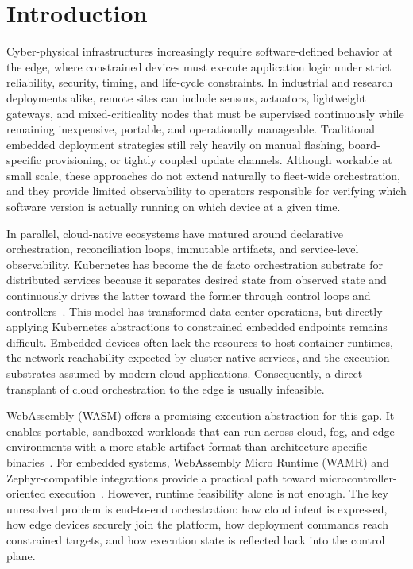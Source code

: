 \section{Introduction}

Cyber-physical infrastructures increasingly require software-defined behavior at the edge, where constrained devices must execute application logic under strict reliability, security, timing, and life-cycle constraints. In industrial and research deployments alike, remote sites can include sensors, actuators, lightweight gateways, and mixed-criticality nodes that must be supervised continuously while remaining inexpensive, portable, and operationally manageable. Traditional embedded deployment strategies still rely heavily on manual flashing, board-specific provisioning, or tightly coupled update channels. Although workable at small scale, these approaches do not extend naturally to fleet-wide orchestration, and they provide limited observability to operators responsible for verifying which software version is actually running on which device at a given time.

In parallel, cloud-native ecosystems have matured around declarative orchestration, reconciliation loops, immutable artifacts, and service-level observability. Kubernetes has become the de facto orchestration substrate for distributed services because it separates desired state from observed state and continuously drives the latter toward the former through control loops and controllers~\cite{kubernetes}. This model has transformed data-center operations, but directly applying Kubernetes abstractions to constrained embedded endpoints remains difficult. Embedded devices often lack the resources to host container runtimes, the network reachability expected by cluster-native services, and the execution substrates assumed by modern cloud applications. Consequently, a direct transplant of cloud orchestration to the edge is usually infeasible.

WebAssembly (WASM) offers a promising execution abstraction for this gap. It enables portable, sandboxed workloads that can run across cloud, fog, and edge environments with a more stable artifact format than architecture-specific binaries~\cite{haas_wasm}. For embedded systems, WebAssembly Micro Runtime (WAMR) and Zephyr-compatible integrations provide a practical path toward microcontroller-oriented execution~\cite{wamr,zephyr}. However, runtime feasibility alone is not enough. The key unresolved problem is end-to-end orchestration: how cloud intent is expressed, how edge devices securely join the platform, how deployment commands reach constrained targets, and how execution state is reflected back into the control plane.

